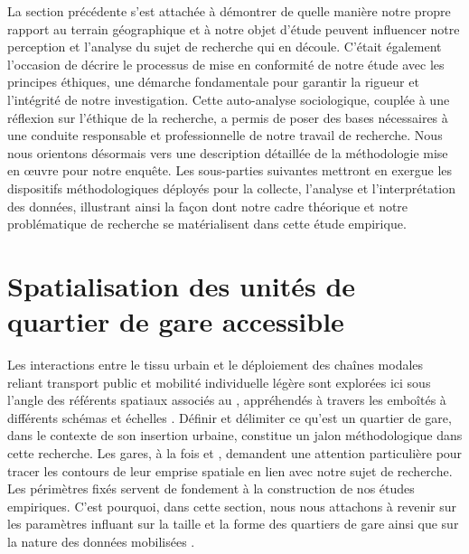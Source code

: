 \begin{refsegment}
La section précédente s'est attachée à démontrer de quelle manière notre propre rapport au terrain géographique et à notre objet d'étude peuvent influencer notre perception et l'analyse du sujet de recherche qui en découle. C'était également l'occasion de décrire le processus de mise en conformité de notre étude avec les principes éthiques, une démarche fondamentale pour garantir la rigueur et l'intégrité de notre investigation. Cette auto-analyse sociologique, couplée à une réflexion sur l'éthique de la recherche, a permis de poser des bases nécessaires à une conduite responsable et professionnelle de notre travail de recherche. Nous nous orientons désormais vers une description détaillée de la méthodologie mise en œuvre pour notre enquête. Les sous-parties suivantes mettront en exergue les dispositifs méthodologiques déployés pour la collecte, l'analyse et l'interprétation des données, illustrant ainsi la façon dont notre cadre théorique et notre problématique de recherche se matérialisent dans cette étude empirique.%

    \newpage
\section{Spatialisation des unités de quartier de gare accessible
    \label{chap3:quartiers-gare}
    }

Les interactions entre le tissu urbain et le déploiement des chaînes modales reliant transport public et mobilité individuelle légère sont explorées ici sous l’angle des référents spatiaux associés au , appréhendés à travers les  emboîtés à différents schémas et échelles \textcolor{blue}{\autocite[14]{menerault_gares_2001}}. Définir et délimiter ce qu’est un quartier de gare, dans le contexte de son insertion urbaine, constitue un jalon méthodologique dans cette recherche. Les gares, à la fois  et  \textcolor{blue}{\autocite[40]{serviant_gare_2015}}, demandent une attention particulière pour tracer les contours de leur emprise spatiale en lien avec notre sujet de recherche. Les périmètres fixés servent de fondement à la construction de nos études empiriques. C'est pourquoi, dans cette section, nous nous attachons à revenir sur les paramètres influant sur la taille et la forme des quartiers de gare ainsi que sur la nature des données mobilisées \textcolor{blue}{\autocite[383]{forsch_metrochrones_2023}}.%


\end{refsegment}
